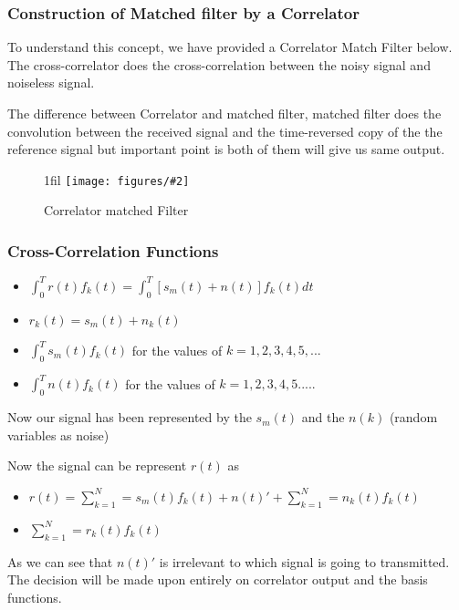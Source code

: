 \documentclass{beamer}
\makeatletter
\newcommand*{\centerfloat}{%
  \parindent \z@
  \leftskip \z@ \@plus 1fil \@minus \textwidth
  \rightskip\leftskip
  \parfillskip \z@skip}
\newcommand{\fig}[3]{
  \begin{figure}[H]
  \centerfloat
    \texttt{[image: figures/\#2]}
    \caption{#3}
  \end{figure}
}
\makeatother
\begin{document}
\begin{frame}
	\frametitle{Construction of Matched filter by a Correlator}
To understand this concept, we have provided a Correlator Match Filter below. The cross-correlator does the cross-correlation between the noisy signal and noiseless signal.

The difference between Correlator and matched filter, matched filter does the convolution between the received signal and the time-reversed copy of the the reference signal but important point is both of them will give us same output. 
	\fig{3cm}{correlator_matched_filter.png}{Correlator matched Filter}
\end{frame}
\begin{frame}
	\frametitle{Cross-Correlation Functions }
	
\begin{itemize}
	\item $\int_{0}^{T} r(t) f_k(t)=\int_{0}^{T} [s_m(t)+n(t)] f_k(t) dt$
	\item $r_k(t)=s_m(t)+n_k(t)$
	\item $\int_{0}^{T} s_m(t) f_k(t) $ for the values of $k= 1,2,3,4,5,...$
	\item $\int_{0}^{T} n(t) f_k(t) $ for the values of $k=1,2,3,4,5.....$
\end{itemize}

Now our signal has been represented by the $s_m(t)$ and the $n(k)$ (random variables as noise)

Now the signal can be represent $r(t)$ as

\begin{itemize}
	\item $r(t)= \sum\limits_{k=1}^N = s_m(t) f_k(t)+ n(t)'+\sum\limits_{k=1}^N = n_k(t) f_k(t)$
	\item $\sum\limits_{k=1}^N = r_k(t) f_k(t)$
\end{itemize}

As we can see that $n(t)'$ is irrelevant to which signal is going to transmitted. The decision will be made upon entirely on correlator output and the basis functions. 
\end{frame}
\end{document}
